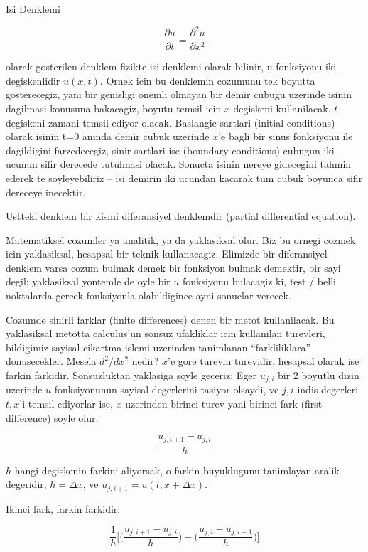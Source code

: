 \documentclass[12pt,fleqn]{article}\usepackage{../common}
\begin{document}
Isi Denklemi

$$ \frac{\partial u}{\partial t} = \frac{\partial^2u}{\partial x^2} $$

olarak gosterilen denklem fizikte isi denklemi olarak bilinir, u
fonksiyonu iki degiskenlidir $u(x,t)$. Ornek icin bu denklemin
cozumunu tek boyutta gosterecegiz, yani bir genisligi onemli olmayan
bir demir cubugu uzerinde isinin dagilmasi konusuna bakacagiz, boyutu
temsil icin $x$ degiskeni kullanilacak. $t$ degiskeni zamani temsil
ediyor olacak. Baslangic sartlari (initial conditions) olarak isinin
t=0 aninda demir cubuk uzerinde $x$'e bagli bir sinus fonksiyonu ile
dagildigini farzedecegiz, sinir sartlari ise (boundary conditions)
cubugun iki ucunun sifir derecede tutulmasi olacak. Sonucta isinin
nereye gidecegini tahmin ederek te soyleyebiliriz -- isi demirin iki
ucundan kacarak tum cubuk boyunca sifir dereceye inecektir.

Ustteki denklem bir kismi diferansiyel denklemdir (partial
differential equation).

Matematiksel cozumler ya analitik, ya da yaklasiksal olur. Biz bu ornegi cozmek
icin yaklasiksal, hesapsal bir teknik kullanacagiz. Elimizde bir diferansiyel
denklem varsa cozum bulmak demek bir fonksiyon bulmak demektir, bir sayi degil;
yaklasiksal yontemle de oyle bir $u$ fonksiyonu bulacagiz ki, test / belli
noktalarda gercek fonksiyonla olabildigince ayni sonuclar verecek.

Cozumde sinirli farklar (finite differences) denen bir metot kullanilacak. Bu
yaklasiksal metotta calculus'un sonsuz ufakliklar icin kullanilan turevleri,
bildigimiz sayisal cikartma islemi uzerinden tanimlanan ``farkliliklara''
donusecekler. Mesela $d^2/dx^2$ nedir? $x$'e gore turevin turevidir, hesapsal
olarak ise farkin farkidir. Sonsuzluktan yaklasiga soyle geceriz: Eger $u_{j,i}$
bir 2 boyutlu dizin uzerinde $u$ fonksiyonunun sayisal degerlerini tasiyor
olsaydi, ve $j, i$ indis degerleri $t, x$'i temsil ediyorlar ise, $x$ uzerinden
birinci turev yani birinci fark (first difference) soyle olur:

$$ \frac{u_{j,i+1}-u_{j,i}}{h} $$

$h$ hangi degiskenin farkini aliyorsak, o farkin buyuklugunu
tanimlayan aralik degeridir, $h=\Delta x$, ve $u_{j,i+1} = u(t,x +
\Delta x)$.

Ikinci fark, farkin farkidir:

$$
\frac{1}{h}
\bigg[
\bigg( \frac{u_{j,i+1}-u_{j,i}}{h} \bigg) -
\bigg( \frac{u_{j,i}-u_{j,i-1}}{h} \bigg)
\bigg] 
$$
\end{document}
